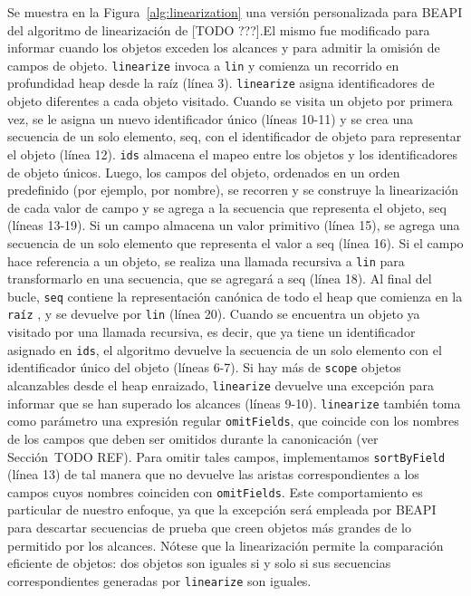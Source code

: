 Se muestra en la Figura~\ref{alg:linearization} una versión personalizada para \textsf{BEAPI} del algoritmo de linearización de [TODO ???].El mismo fue modificado para informar cuando los objetos exceden los alcances y para admitir la omisión de campos de objeto. \texttt{linearize} invoca a \texttt{lin} y  comienza un recorrido en profundidad heap desde la raíz (línea 3). \texttt{linearize} asigna identificadores de objeto diferentes a cada objeto visitado. Cuando se visita un objeto por primera vez, se le asigna un nuevo identificador único (líneas 10-11) y se crea una secuencia de un solo elemento, seq, con el identificador de objeto para representar el objeto (línea 12). \texttt{ids} almacena el mapeo entre los objetos y los identificadores de objeto únicos. Luego, los campos del objeto, ordenados en un orden predefinido (por ejemplo, por nombre), se recorren y se construye la linearización de cada valor de campo y se agrega a la secuencia que representa el objeto, seq (líneas 13-19). Si un campo almacena un valor primitivo (línea 15), se agrega una secuencia de un solo elemento que representa el valor a seq (línea 16). Si el campo hace referencia a un objeto, se realiza una llamada recursiva a \texttt{lin}  para transformarlo en una secuencia, que se agregará a seq (línea 18). Al final del bucle, \texttt{seq}  contiene la representación canónica de todo el heap que comienza en la \texttt{raíz} , y se devuelve por \texttt{lin} (línea 20). Cuando se encuentra un objeto ya visitado por una llamada recursiva, es decir, que ya tiene un identificador asignado en  \texttt{ids}, el algoritmo devuelve la secuencia de un solo elemento con el identificador único del objeto (líneas 6-7). Si hay más de \texttt{scope} objetos alcanzables desde el heap enraizado, \texttt{linearize} devuelve una excepción para informar que se han superado los alcances (líneas 9-10). \texttt{linearize} también toma como parámetro una expresión regular \texttt{omitFields}, que coincide con los nombres de los campos que deben ser omitidos durante la canonicación (ver Sección~TODO REF). Para omitir tales campos, implementamos \texttt{sortByField} (línea 13) de tal manera que no devuelve las aristas correspondientes a los campos cuyos nombres coinciden con \texttt{omitFields}. Este comportamiento es particular de nuestro enfoque, ya que la excepción será empleada por BEAPI para descartar secuencias de prueba que creen objetos más grandes de lo permitido por los alcances. Nótese que la linearización permite la comparación eficiente de objetos: dos objetos son iguales si y solo si sus secuencias correspondientes generadas por \texttt{linearize} son iguales.


